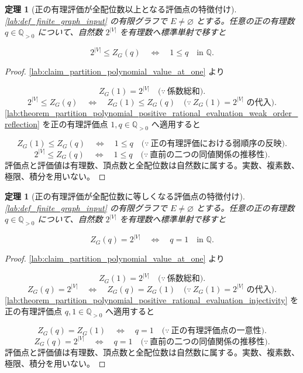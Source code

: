 \documentclass[11pt,a4paper]{article}
\newtheorem{theorem}[definition]{定理}
\theoremstyle{remark}
\begin{document}
\begin{theorem}[正の有理評価が全配位数以上となる評価点の特徴付け]\label{lab:theorem_partition_polynomial_positive_rational_evaluation_at_least_configuration_count}
\cref{lab:def_finite_graph_input}
 の有限グラフで 
$E\ne\varnothing$
 とする。任意の正の有理数 
$q\in\mathbb Q_{>0}$
 について、自然数 
$2^{|V|}$
 を有理数へ標準単射で移すと

\[2^{|V|}\le Z_G(q)\quad\Longleftrightarrow\quad 1\le q\quad\text{in }\mathbb Q.\]
\end{theorem}
\begin{proof}
\cref{lab:claim_partition_polynomial_value_at_one}
 より

\[Z_G(1)=2^{|V|}
\quad\bigl(\because\ \text{係数総和}\bigr).\]
\[2^{|V|}\le Z_G(q)
\quad\Longleftrightarrow\quad
Z_G(1)\le Z_G(q)
\quad\bigl(\because\ Z_G(1)=2^{|V|}\text{ の代入}\bigr).\]
\cref{lab:theorem_partition_polynomial_positive_rational_evaluation_weak_order_reflection}
 を正の有理評価点 
$1,q\in\mathbb Q_{>0}$
 へ適用すると

\[Z_G(1)\le Z_G(q)
\quad\Longleftrightarrow\quad
1\le q
\quad\bigl(\because\ \text{正の有理評価における弱順序の反映}\bigr).\]
\[2^{|V|}\le Z_G(q)
\quad\Longleftrightarrow\quad
1\le q
\quad\bigl(\because\ \text{直前の二つの同値関係の推移性}\bigr).\]
評価点と評価値は有理数、頂点数と全配位数は自然数に属する。実数、複素数、極限、積分を用いない。

\end{proof}

\begin{theorem}[正の有理評価が全配位数に等しくなる評価点の特徴付け]\label{lab:theorem_partition_polynomial_positive_rational_evaluation_equal_configuration_count}
\cref{lab:def_finite_graph_input}
 の有限グラフで 
$E\ne\varnothing$
 とする。任意の正の有理数 
$q\in\mathbb Q_{>0}$
 について、自然数 
$2^{|V|}$
 を有理数へ標準単射で移すと

\[Z_G(q)=2^{|V|}\quad\Longleftrightarrow\quad q=1\quad\text{in }\mathbb Q.\]
\end{theorem}
\begin{proof}
\cref{lab:claim_partition_polynomial_value_at_one}
 より

\[Z_G(1)=2^{|V|}
\quad\bigl(\because\ \text{係数総和}\bigr).\]
\[Z_G(q)=2^{|V|}
\quad\Longleftrightarrow\quad
Z_G(q)=Z_G(1)
\quad\bigl(\because\ Z_G(1)=2^{|V|}\text{ の代入}\bigr).\]
\cref{lab:theorem_partition_polynomial_positive_rational_evaluation_injectivity}
 を正の有理評価点 
$q,1\in\mathbb Q_{>0}$
 へ適用すると

\[Z_G(q)=Z_G(1)
\quad\Longleftrightarrow\quad
q=1
\quad\bigl(\because\ \text{正の有理評価点の一意性}\bigr).\]
\[Z_G(q)=2^{|V|}
\quad\Longleftrightarrow\quad
q=1
\quad\bigl(\because\ \text{直前の二つの同値関係の推移性}\bigr).\]
評価点と評価値は有理数、頂点数と全配位数は自然数に属する。実数、複素数、極限、積分を用いない。

\end{proof}
\end{document}
